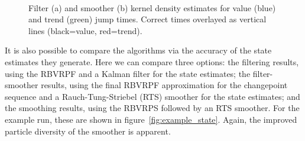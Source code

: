 \documentclass[journal]{IEEEtran}
\begin{document}
\begin{figure}[!t]
\centering
{} \\
\caption{Filter (a) and smoother (b) kernel density estimates for value (blue) and trend (green) jump times. Correct times overlayed as vertical lines (black=value, red=trend).}
\label{fig:example_kdest}
\end{figure}

It is also possible to compare the algorithms via the accuracy of the state estimates they generate. Here we can compare three options: the filtering results, using the RBVRPF and a Kalman filter for the state estimates; the filter-smoother results, using the final RBVRPF approximation for the changepoint sequence and a Rauch-Tung-Striebel (RTS) smoother for the state estimates; and the smoothing results, using the RBVRPS followed by an RTS smoother. For the example run, these are shown in figure~\ref{fig:example_state}. Again, the improved particle diversity of the smoother is apparent.
\end{document}
